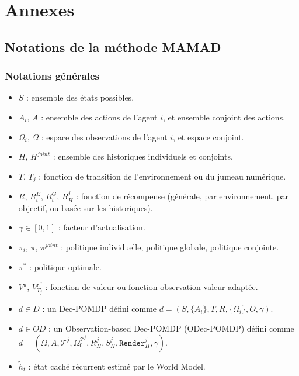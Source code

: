 \clearpage
\thispagestyle{empty}
\null
\newpage

\cleardoublepage
{}
{}
\part*{Annexes}
\label{part:annexes}

\clearpage
\thispagestyle{empty}
\null
\newpage

\chapter{Notations de la méthode MAMAD}

\section{Notations générales}

\begin{itemize}
       \item $S$ : ensemble des états possibles.
       \item $A_i$, $A$ : ensemble des actions de l'agent $i$, et ensemble conjoint des actions.
       \item $\Omega_i$, $\Omega$ : espace des observations de l'agent $i$, et espace conjoint.
       \item $H$, $H^{joint}$ : ensemble des historiques individuels et conjoints.
       \item $T$, $T_j$ : fonction de transition de l'environnement ou du jumeau numérique.
       \item $R$, $R^E_t$, $R^G_t$, $R^j_H$ : fonction de récompense (générale, par environnement, par objectif, ou basée sur les historiques).
       \item $\gamma \in [0,1]$ : facteur d'actualisation.
       \item $\pi_i$, $\pi$, $\pi^{joint}$ : politique individuelle, politique globale, politique conjointe.
       \item $\pi^*$ : politique optimale.
       \item $V^\pi$, $V^{\pi^j}_{T_j}$ : fonction de valeur ou fonction observation-valeur adaptée.
       \item $d \in D$ : un Dec-POMDP défini comme $d = (S,\{A_i\},T,R,\{\Omega_i\},O,\gamma)$.
       \item $d \in OD$ : un Observation-based Dec-POMDP (ODec-POMDP) défini comme $d = (\Omega, A, \mathcal{T}^j, \Omega^{\mathcal{T}^j}_0, R^j_H, S^j_H, \texttt{Render}^j_H, \gamma)$.
       \item $\tilde{h}_t$ : état caché récurrent estimé par le World Model.
\end{itemize}

